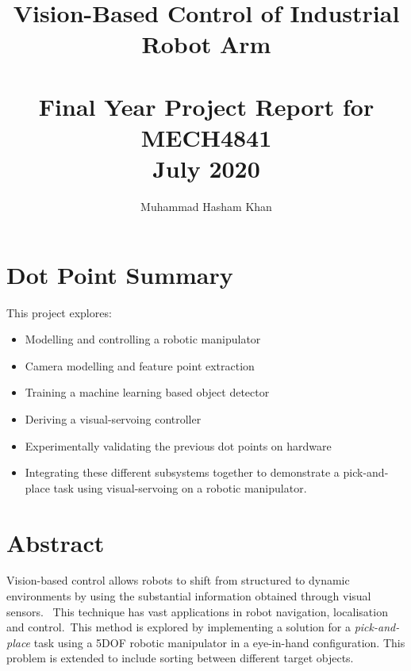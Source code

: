 \documentclass{UoNMCHA}
\numberwithin{equation}{section}
\begin{document}
\title{Vision-Based Control of Industrial Robot Arm \\ \ \\
{\small Final Year Project Report for MECH4841  \\July 2020}}
\author[UoNMCHA]{Muhammad Hasham Khan}
\address[UoNMCHA]{
Student of Mechatronics Engineering,\\
The University of Newcastle, Callaghan, NSW 2308, AUSTRALIA \\
Student Number: 3256011 \\
E-mail: \href{mailto:Muhammad.H.Khan@uon.edu.au}{\textsf{Muhammad.H.Khan@uon.edu.au}}}
\maketitle
\onecolumn

\vspace{-5mm}
\section*{Dot Point Summary}

This project explores:
\begin{itemize}
	\item Modelling and controlling a robotic manipulator
	\item Camera modelling and feature point extraction
	\item Training a machine learning based object detector
	\item Deriving a visual-servoing controller 
	\item Experimentally validating the previous dot points on hardware 
	\item Integrating these different subsystems together to demonstrate a pick-and-place task using visual-servoing on a robotic manipulator.

\end{itemize}

\newpage
\vspace{-5mm}
\section*{Abstract}

Vision-based control allows robots to shift from structured to dynamic environments by using the substantial information obtained through visual sensors. \
This technique has vast applications in robot navigation, localisation and control.\ This method is explored by implementing a solution for
a \textit{pick-and-place} task using a 5DOF robotic manipulator in a eye-in-hand configuration. This problem is extended to include sorting between different target objects. \
\end{document}
